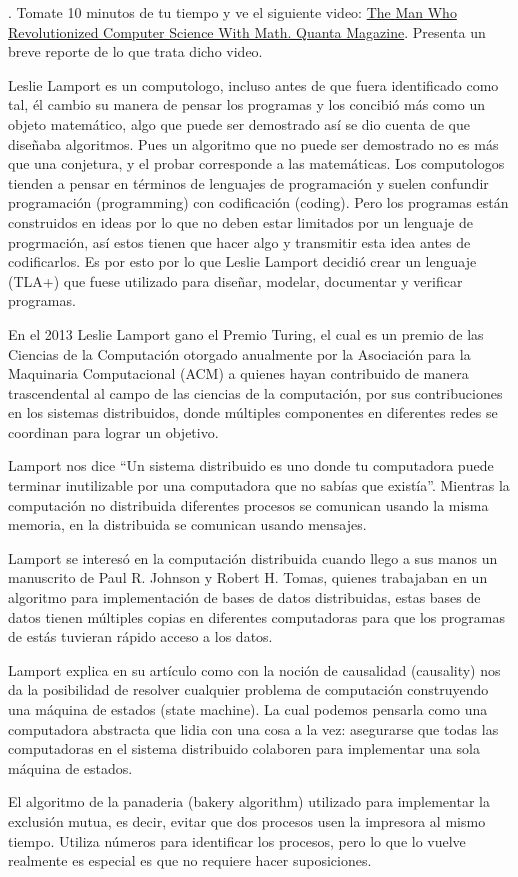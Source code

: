 . Tomate 10 minutos de tu tiempo y ve el siguiente video:
\href{https://www.youtube.com/watch?v=rkZzg7Vowao}{The Man
  Who Revolutionized Computer Science With Math. Quanta Magazine}.
Presenta un breve reporte de lo que trata dicho video.

Leslie Lamport es un computologo, incluso antes de que fuera identificado como tal, él cambio su manera de pensar los programas y los concibió más como un objeto matemático, algo que puede ser demostrado así se dio cuenta de que diseñaba algoritmos.
Pues un algoritmo que no puede ser demostrado no es más que una conjetura, y el probar corresponde a las matemáticas.
Los computologos tienden a pensar en términos de lenguajes de programación y suelen confundir programación (programming) con codificación (coding). Pero los programas están construidos en ideas por lo que no deben estar limitados por un lenguaje de progrmación, así estos tienen que hacer algo y transmitir esta idea antes de codificarlos.
Es por esto por lo que Leslie Lamport decidió crear un lenguaje (TLA+) que fuese utilizado para diseñar, modelar, documentar y verificar programas.


En el 2013 Leslie Lamport gano el Premio Turing, el cual es un premio de las Ciencias de la Computación otorgado anualmente por la Asociación para la Maquinaria Computacional (ACM) a quienes hayan contribuido de manera trascendental al campo de las ciencias de la computación, por sus contribuciones en los sistemas distribuidos, donde múltiples componentes en diferentes redes se coordinan para lograr un objetivo.

Lamport nos dice “Un sistema distribuido es uno donde tu computadora puede terminar inutilizable por una computadora que no sabías que existía”.
Mientras la computación no distribuida diferentes procesos se comunican usando la misma memoria, en la distribuida se comunican usando mensajes.

Lamport se interesó en la computación distribuida cuando llego a sus manos un manuscrito de Paul R. Johnson y Robert H. Tomas, quienes trabajaban en un algoritmo para implementación de bases de datos distribuidas, estas bases de datos tienen múltiples copias en diferentes computadoras para que los programas de estás tuvieran rápido acceso a los datos.

Lamport explica en su artículo como con la noción de causalidad (causality) nos da la posibilidad de resolver cualquier problema de computación construyendo una máquina de estados (state machine). La cual podemos pensarla como una computadora abstracta que lidia con una cosa a la vez: asegurarse que todas las computadoras en el sistema distribuido colaboren para implementar una sola máquina de estados.


El algoritmo de la panaderia (bakery algorithm) utilizado para implementar la exclusión mutua, es decir, evitar que dos procesos usen la impresora al mismo tiempo. Utiliza números para identificar los procesos, pero lo que lo vuelve realmente es especial es que no requiere hacer suposiciones.


